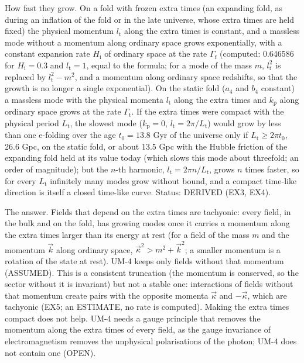 \documentclass[
  10pt,
]{article}
\begin{document}
How fast they grow. On a fold with frozen extra times (an expanding
fold, as during an inflation of the fold or in the late universe, whose
extra times are held fixed) the physical momentum \(l_{\mathrm{t}}\)
along the extra times is constant, and a massless mode without a
momentum along ordinary space grows exponentially, with a constant
expansion rate \(H_{\mathrm{i}}\) of ordinary space at the rate
\(\Gamma_{\mathrm{f}}\) (computed: 0.646586 for \(H_{\mathrm{i}} = 0.3\)
and \(l_{\mathrm{t}} = 1\), equal to the formula; for a mode of the mass
\(m\), \(l_{\mathrm{t}}^2\) is replaced by \(l_{\mathrm{t}}^2 - m^2\),
and a momentum along ordinary space redshifts, so that the growth is no
longer a single exponential). On the static fold (\(a_4\) and \(b_4\)
constant) a massless mode with the physical momenta \(l_{\mathrm{t}}\)
along the extra times and \(k_{\mathrm{p}}\) along ordinary space grows
at the rate \(\Gamma_{\mathrm{t}}\). If the extra times were compact
with the physical period \(L_{\mathrm{t}}\), the slowest mode
(\(k_{\mathrm{p}} = 0\), \(l_{\mathrm{t}} = 2\pi/L_{\mathrm{t}}\)) would
grow by less than one e-folding over the age \(t_0 = 13.8\) Gyr of the
universe only if \(L_{\mathrm{t}} \ge 2\pi t_0\), 26.6 Gpc, on the
static fold, or about 13.5 Gpc with the Hubble friction of the expanding
fold held at its value today (which slows this mode about threefold; an
order of magnitude); but the \(n\)-th harmonic,
\(l_{\mathrm{t}} = 2\pi n/L_{\mathrm{t}}\), grows \(n\) times faster, so
for every \(L_{\mathrm{t}}\) infinitely many modes grow without bound,
and a compact time-like direction is itself a closed time-like curve.
Status: DERIVED (EX3, EX4).

The answer. Fields that depend on the extra times are tachyonic: every
field, in the bulk and on the fold, has growing modes once it carries a
momentum along the extra times larger than its energy at rest (for a
field of the mass \(m\) and the momentum \(\vec k\) along ordinary
space, \(\vec\kappa^2 > m^2 + \vec k^2\); a smaller momentum is a
rotation of the state at rest). UM-4 keeps only fields without that
momentum (ASSUMED). This is a consistent truncation (the momentum is
conserved, so the sector without it is invariant) but not a stable one:
interactions of fields without that momentum create pairs with the
opposite momenta \(\vec\kappa\) and \(-\vec\kappa\), which are tachyonic
(EX5; an ESTIMATE, no rate is computed). Making the extra times compact
does not help. UM-4 needs a gauge principle that removes the momentum
along the extra times of every field, as the gauge invariance of
electromagnetism removes the unphysical polarisations of the photon;
UM-4 does not contain one (OPEN).
\end{document}
